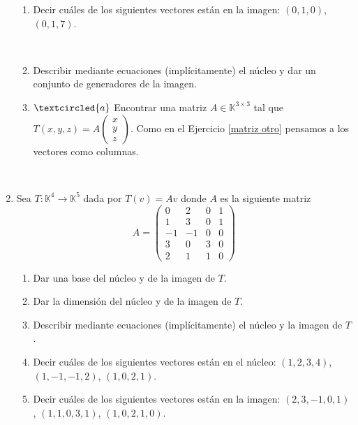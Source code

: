 \documentclass[12pt]{amsart}
\begin{document}
\begin{enumerate}[resume, topsep=5pt,itemsep=5pt]
\begin{enumerate}
\item Decir cu\'ales de los siguientes vectores est\'an en la imagen: $(0,1,0)$, $(0,1,7)$.

\

 \item\label{Txyz nucleo} Describir mediante ecuaciones (impl\'icitamente) el n\'ucleo y dar un conjunto de generadores de la imagen.
 
 \item\label{matriz} $\textcircled{a}$ Encontrar una matriz  $A\in\mathbb{K}^{3\times 3}$ tal que $T(x,y,z)=A\left(\begin{matrix}
	x\\y\\z \end{matrix}
	\right)$.  Como en el Ejercicio \eqref{matriz otro} pensamos a los vectores como columnas.
	
\end{enumerate}

\


\item Sea $T: \mathbb{K}^4 \to \mathbb{K}^5$ dada por $T(v) = Av$ donde $A$ es la siguiente matriz
	$$
	A=\left(\begin{matrix}
	0& 2& 0&1\\   1& 3& 0&1\\  -1&-1&0&0\\3&0&3&0\\2&1&1&0 \end{matrix}
	\right)
	$$
	\begin{enumerate}[topsep=5pt,itemsep=5pt]
		\item Dar una base del n\'ucleo y de la imagen de $T$. 
		\item Dar la dimensi\'on del n\'ucleo y de la imagen de $T$.
		\item Describir mediante ecuaciones (impl\'icitamente) el n\'ucleo y la imagen de $T$.
        \item Decir cu\'ales de los siguientes vectores est\'an en el n\'ucleo:
		$(1,2,3,4)$, $(1,-1,-1,2)$, $(1,0,2,1)$.
		\item Decir cu\'ales de los siguientes vectores est\'an en la imagen:
		$(2,3,-1,0,1)$, $(1,1,0,3,1)$, $(1,0,2,1,0)$.
	\end{enumerate}
	
	\
	


\end{enumerate}
\end{document}
